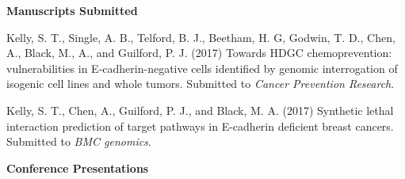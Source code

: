 \textbf{Manuscripts Submitted}

\begin{small}
Kelly, S. T., Single, A. B., Telford, B. J., Beetham, H. G, Godwin, T. D., Chen, A., Black, M., A., and Guilford, P. J. (2017) Towards HDGC chemoprevention: vulnerabilities in \gls{E-cadherin}-negative cells identified by \gls{genomic} interrogation of isogenic cell lines and whole tumors.  Submitted to \textit{Cancer Prevention Research}.

Kelly, S. T., Chen, A., Guilford, P. J., and Black, M. A. (2017) Synthetic lethal interaction prediction of target pathways in \gls{E-cadherin} deficient breast cancers. Submitted to \textit{BMC \Glspl{genomic}}.
\end{small}
\iffalse
\textbf{Community Blog Posts}

Black, M. A., Kelly, S. T., and Cadzow, M.
Posted on the \textit{Software Carpentry} website 2016 July 4\textsuperscript{th}: 
``Software Carpentry workshop at the University of Otago, New Zealand''
\url{https://software-carpentry.org/blog/2016/07/otago-workshop.html}

Kelly, S. T., Black, M., A., Bae, S., Hayek, W., and Pawlik, A. Posted on the \textit{Software Carpentry} website 2016 September 28\textsuperscript{th}:  ``Software Carpentry Workshop Attendance: a New Zealand Perspective``
\url{https://software-carpentry.org/blog/2016/09/attendance-nz.html}
\fi

\textbf{Conference Presentations}

